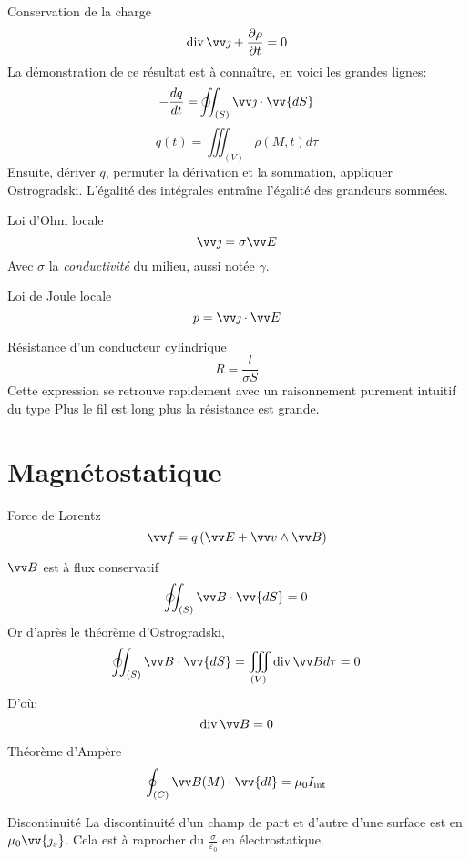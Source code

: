 \documentclass[french, a4paper, 11pt, twocolumn]{article}
\newcommand{\po}{\left(}         %
\newcommand{\pf}{\right)}        %
\newcommand{\pof}[1]{\po #1 \pf} %
\DeclareMathOperator{\diverg}{div}        %
\newcommand{\ooint}{\ocircle\hspace{-3.65mm}\int\hspace{-2mm}\int}
\begin{document}
\begin{cadre}{Conservation de la charge}
  \[\diverg \vv\jmath + \dfrac{\partial\rho}{\partial t} = 0\]
  La démonstration de ce résultat est à connaître, en voici les grandes lignes:
  \[-\dfrac{dq}{dt} = \ooint_{(S)}\vv \jmath \cdot\vv{dS}\]
  \[q(t) = \iiint_{(V)} \rho(M, t)d\tau\]
  Ensuite, dériver $q$, permuter la dérivation et la sommation, appliquer Ostrogradski. L'égalité des intégrales entraîne l'égalité des grandeurs sommées.
\end{cadre}

\begin{cadre}{Loi d'Ohm locale}
  \[\vv \jmath = \sigma\vv E\]
  Avec $\sigma$ la \emph{conductivité} du milieu, aussi notée $\gamma$.
\end{cadre}

\begin{cadre}{Loi de Joule locale}
  \[p = \vv\jmath\cdot\vv E\]
\end{cadre}

\begin{cadre}{Résistance d'un conducteur cylindrique}
  \[R = \dfrac{l}{\sigma S}\]
  Cette expression se retrouve rapidement avec un raisonnement purement intuitif du type \og Plus le fil est long plus la résistance est grande\fg{}.
\end{cadre}

\section{Magnétostatique}
\begin{cadre}{Force de Lorentz}
  \[ \vv f = q\pof{\vv E + \vv v \wedge \vv B}\]
\end{cadre}

\begin{cadre}{$\vv B$ est à flux conservatif}
  \[\ooint_{(S)}\vv B \cdot\vv{dS} = 0\]
  Or d'après le théorème d'Ostrogradski,
  \[\ooint_{(S)}\vv B \cdot\vv{dS} = \iiint_{(V)}\diverg \vv B d\tau = 0\]
  D'où:
  \[\diverg \vv B = 0\]
\end{cadre}

\begin{cadre}{Théorème d'Ampère}
  \[\oint_{(C)} \vv B(M)\cdot \vv{dl} = \mu_{0}I_{\text{int}}\]
\end{cadre}

\begin{cadre}{Discontinuité}
  La discontinuité d'un champ de part et d'autre d'une surface est en $\mu_{0}\vv{\jmath_{s}}$. Cela est à raprocher du $\frac{\sigma}{\varepsilon_{0}}$ en électrostatique.
\end{cadre}
\end{document}
